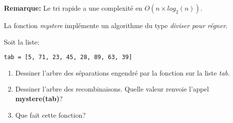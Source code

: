 \documentclass[a4paper,11pt]{article}
\begin{document}
\begin{Form}
\begin{exo}
\begin{enumerate}
\end{enumerate}
\textbf{Remarque:} Le tri rapide a une complexité en $O(n×log_2(n))$.
\end{exo}
\begin{exo}
La fonction \emph{mystere} implémente un algorithme du type \emph{diviser pour régner}.

Soit la liste:
\begin{lstlisting}
tab = [5, 71, 23, 45, 28, 89, 63, 39]
\end{lstlisting}
\begin{enumerate}
\item Dessiner l'arbre des séparations engendré par la fonction sur la liste \emph{tab}.
\item Dessiner l'arbre des recombinaisons. Quelle valeur renvoie l'appel \textbf{mystere(tab)}?
\item Que fait cette fonction?
\end{enumerate}
\end{exo}
\end{Form}
\end{document}
